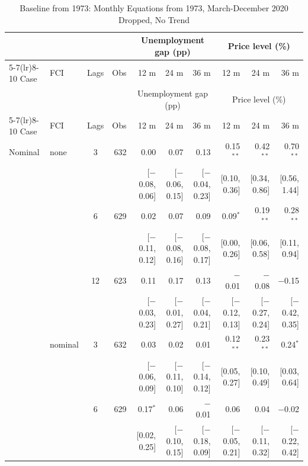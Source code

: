 \begingroup\scriptsize\setlength{\tabcolsep}{0.9pt}
\begin{longtable}{llcrrrrrrr}
\caption{Baseline from 1973: Monthly Equations from 1973, March-December 2020 Dropped, No Trend}\label{tab:appB73}\\
\toprule
 & & & & \multicolumn{3}{c}{Unemployment gap (pp)} & \multicolumn{3}{c}{Price level (\%)}\\ \cmidrule(lr){5-7}\cmidrule(lr){8-10}
Case & FCI & Lags & Obs & 12 m & 24 m & 36 m & 12 m & 24 m & 36 m\\
\midrule\endfirsthead
\toprule
 & & & & \multicolumn{3}{c}{Unemployment gap (pp)} & \multicolumn{3}{c}{Price level (\%)}\\ \cmidrule(lr){5-7}\cmidrule(lr){8-10}
Case & FCI & Lags & Obs & 12 m & 24 m & 36 m & 12 m & 24 m & 36 m\\
\midrule\endhead
\bottomrule\endfoot
Nominal & none & 3 & 632 & 0.00 & 0.07 & 0.13 & 0.15$^{**}$ & 0.42$^{**}$ & 0.70$^{**}$\\
 & & & & {\scriptsize [$-$0.08, 0.06]} & {\scriptsize [$-$0.06, 0.15]} & {\scriptsize [$-$0.04, 0.23]} & {\scriptsize [0.10, 0.36]} & {\scriptsize [0.34, 0.86]} & {\scriptsize [0.56, 1.44]}\\
 &  & 6 & 629 & 0.02 & 0.07 & 0.09 & 0.09$^{*}$ & 0.19$^{**}$ & 0.28$^{**}$\\
 & & & & {\scriptsize [$-$0.11, 0.12]} & {\scriptsize [$-$0.08, 0.16]} & {\scriptsize [$-$0.08, 0.17]} & {\scriptsize [0.00, 0.26]} & {\scriptsize [0.06, 0.58]} & {\scriptsize [0.11, 0.94]}\\
 &  & 12 & 623 & 0.11 & 0.17 & 0.13 & $-$0.01 & $-$0.08 & $-$0.15\\
 & & & & {\scriptsize [$-$0.03, 0.23]} & {\scriptsize [$-$0.01, 0.27]} & {\scriptsize [$-$0.04, 0.21]} & {\scriptsize [$-$0.12, 0.13]} & {\scriptsize [$-$0.27, 0.24]} & {\scriptsize [$-$0.42, 0.35]}\\
 & nominal & 3 & 632 & 0.03 & 0.02 & 0.01 & 0.12$^{**}$ & 0.23$^{**}$ & 0.24$^{*}$\\
 & & & & {\scriptsize [$-$0.06, 0.09]} & {\scriptsize [$-$0.11, 0.10]} & {\scriptsize [$-$0.14, 0.12]} & {\scriptsize [0.05, 0.27]} & {\scriptsize [0.10, 0.49]} & {\scriptsize [0.03, 0.64]}\\
 &  & 6 & 629 & 0.17$^{*}$ & 0.06 & $-$0.01 & 0.06 & 0.04 & $-$0.02\\
 & & & & {\scriptsize [0.02, 0.25]} & {\scriptsize [$-$0.10, 0.15]} & {\scriptsize [$-$0.18, 0.09]} & {\scriptsize [$-$0.05, 0.21]} & {\scriptsize [$-$0.11, 0.32]} & {\scriptsize [$-$0.22, 0.42]}\\

\end{longtable}

